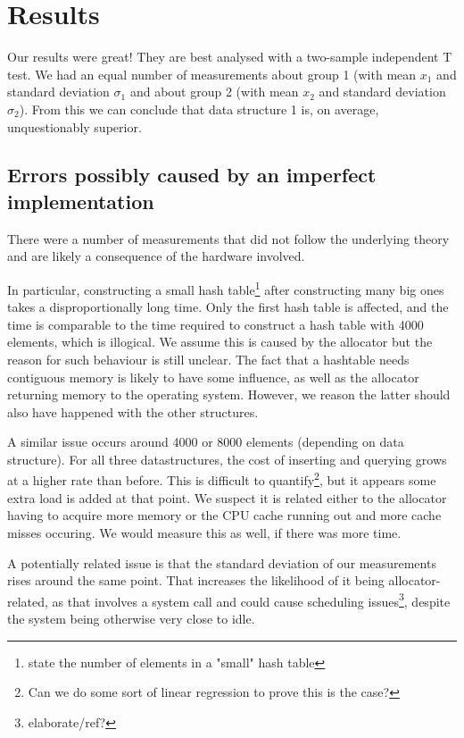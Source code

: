 \documentclass[12pt,a4paper]{article}
\begin{document}
    \section{Results}

    Our results were great!  They are best analysed with a two-sample independent T test.  We had an
    equal number of measurements about group 1 (with mean $x_1$ and standard deviation $\sigma_1$ and
    about group 2 (with mean $x_2$ and standard deviation $\sigma_2$).  From this we can conclude that
    data structure 1 is, on average, unquestionably superior.

    \subsection{Errors possibly caused by an imperfect implementation}

    There were a number of measurements that did not follow the underlying theory and are likely a
    consequence of the hardware involved.

    In particular, constructing a small hash table\footnote{state the number of elements in a
    "small" hash table} after constructing many big ones takes a disproportionally long time.  Only
    the first hash table is affected, and the time is comparable to the time required to construct a
    hash table with 4000 elements, which is illogical.  We assume this is caused by the allocator
    but the reason for such behaviour is still unclear.  The fact that a hashtable needs contiguous
    memory is likely to have some influence, as well as the allocator returning memory to the
    operating system.  However, we reason the latter should also have happened with the other
    structures.

    A similar issue occurs around 4000 or 8000 elements (depending on data structure).  For all
    three datastructures, the cost of inserting and querying grows at a higher rate than before.
    This is difficult to quantify\footnote{Can we do some sort of linear regression to prove this is
    the case?}, but it appears some extra load is added at that point.  We suspect it is related
    either to the allocator having to acquire more memory or the CPU cache running out and more
    cache misses occuring.  We would measure this as well, if there was more time.

    A potentially related issue is that the standard deviation of our measurements rises around the
    same point.  That increases the likelihood of it being allocator-related, as that involves a
    system call and could cause scheduling issues\footnote{elaborate/ref?}, despite the system being
    otherwise very close to idle.
\end{document}
